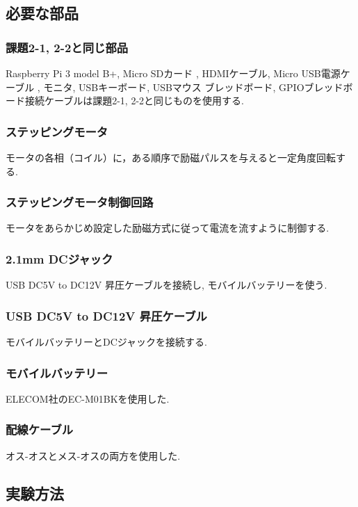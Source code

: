 \documentclass{ltjsarticle} %
\begin{document}
\subsection{必要な部品}

\subsubsection{課題2-1, 2-2と同じ部品}
Raspberry Pi 3 model B+, Micro SDカード
, HDMIケーブル, Micro USB電源ケーブル
, モニタ, USBキーボード, USBマウス
ブレッドボード, GPIOブレッドボード接続ケーブルは課題2-1, 2-2と同じものを使用する. 

\subsubsection{ステッピングモータ}
モータの各相（コイル）に，ある順序で励磁パルスを与えると⼀定⾓度回転する. 

\subsubsection{ステッピングモータ制御回路}
モータをあらかじめ設定した励磁⽅式に従って電流を流すように制御する. 

\subsubsection{2.1mm DCジャック}
USB DC5V to DC12V 昇圧ケーブルを接続し, モバイルバッテリーを使う. 

\subsubsection{USB DC5V to DC12V 昇圧ケーブル}
モバイルバッテリーとDCジャックを接続する. 

\subsubsection{モバイルバッテリー}
ELECOM社のEC-M01BKを使用した. 

\subsubsection{配線ケーブル}
オス-オスとメス-オスの両方を使用した. 


\subsection{実験方法}
\end{document}
